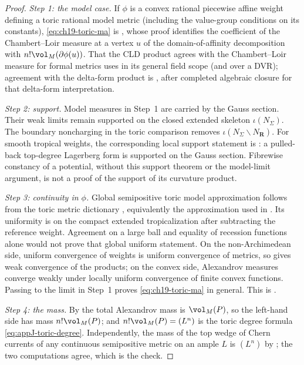 \begin{proof}
\emph{Step 1: the model case.}  If $\phi$ is a convex rational piecewise
affine weight defining a toric rational model metric (including the
value-group conditions on its constants), \eqref{eq:ch19-toric-ma} is
, whose proof identifies the coefficient of
the Chambert--Loir measure at a vertex $u$ of the domain-of-affinity
decomposition with $n!\vol_M(\partial\phi(u))$.  That the CLD product agrees
with the Chambert--Loir measure for formal metrics uses
 in its general field scope (and
 over a DVR); agreement with the delta-form product
is , after completed algebraic closure for
that delta-form interpretation.

\emph{Step 2: support.}  Model measures in Step~1 are carried by the
Gauss section.  Their weak limits remain supported on the closed extended
skeleton $\iota(N_\Sigma)$.  The boundary noncharging in the toric
comparison removes $\iota(N_\Sigma\smallsetminus N_{\mathbf R})$.
For smooth tropical weights, the corresponding local support statement is
\cite[Proposition~2.3.6]{BGJKK25}: a pulled-back top-degree Lagerberg form
is supported on the Gauss section.  Fibrewise constancy of a potential,
without this support theorem or the model-limit argument, is not a proof
of the support of its curvature product.

\emph{Step 3: continuity in $\phi$.}  Global semipositive toric model
approximation follows from the toric metric dictionary
\cite[\S5.3.7 and Theorem~5.3.11]{BGJKK25}, equivalently the approximation
used in .  Its uniformity is on the compact
extended tropicalization after subtracting the reference weight.  Agreement
on a large ball and equality of recession functions alone would not prove
that global uniform statement.  On the non-Archimedean side, uniform
convergence of weights is uniform convergence of metrics, so
 gives weak convergence of the products; on the
convex side, Alexandrov measures converge weakly under locally uniform
convergence of finite convex functions.  Passing to the limit in Step~1
proves \eqref{eq:ch19-toric-ma} in general.  This is
.

\emph{Step 4: the mass.}  By  the total
Alexandrov mass is $\vol_M(P)$, so the left-hand side has mass
$n!\vol_M(P)$; and $n!\vol_M(P)=(L^n)$ is the toric degree formula
\eqref{eq:appJ-toric-degree}.  Independently, the mass of the top wedge of
Chern currents of any continuous semipositive metric on an ample $L$ is
$(L^n)$ by ; the two computations agree, which
is the check.
\end{proof}

